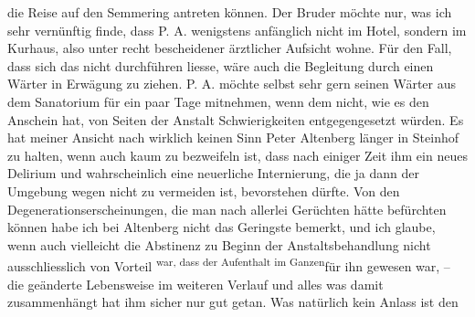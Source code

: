 \begin{ledgroupsized}[t]{13cm}
               die Reise auf den Semmering antreten können. Der Bruder möchte nur, was ich sehr
               vernünftig finde, dass P. A. wenigstens anfänglich
               nicht im Hotel, sondern im Kurhaus, also unter recht
               bescheidener ärztlicher Aufsicht wohne. Für den Fall, dass sich das nicht durchführen
               liesse, wäre auch die Begleitung durch einen Wärter in Erwägung zu ziehen. P. A. möchte selbst sehr gern seinen Wärter aus dem Sanatorium für
               ein paar Tage mitnehmen, wenn dem nicht, wie es den Anschein hat, von Seiten der
               Anstalt Schwierigkei{\pb}ten entgegengesetzt würden. Es hat meiner Ansicht nach wirklich keinen Sinn Peter Altenberg länger in Steinhof zu halten, wenn auch kaum zu bezweifeln ist, dass nach
               einiger Zeit ihm ein neues Delirium und wahrscheinlich eine neuerliche Internierung,
               die ja dann der Umgebung wegen nicht zu vermeiden ist, bevorstehen dürfte. Von den
               Degenerationserscheinungen, die man nach allerlei Gerüchten hätte befürchten können
               habe ich bei Altenberg nicht das Geringste
               bemerkt, und ich glaube, wenn auch vielleicht die \label{T_L02129_1v}\label{T_L02129_1h} Abstinenz zu
               Beginn der Anstaltsbehandlung nicht ausschliesslich von Vorteil \substVorne{}\textsuperscript{war, dass der Aufenthalt im Ganzen}{\allowbreak}\substDazwischen{}für ihn gewesen war\substHinten{}, – die geänderte Lebensweise im weiteren Verlauf und alles was damit
               zusammenhängt hat ihm sicher nur gut getan. Was natürlich kein Anlass ist den

\end{ledgroupsized}
